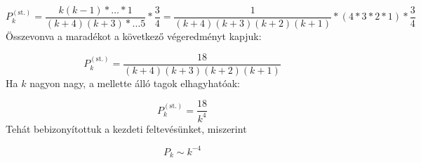 \begin{equation} \label{eq:23}
    P_{k}^{\left( \text{st.} \right)}
    =
    \frac{k \left( k - 1 \right) * \dotsc * 1}{\left( k + 4 \right) \left( k + 3 \right) * \dotsc 5} * \frac{3}{4}
    =
    \frac{1}{\left( k + 4 \right) \left( k + 3 \right) \left( k + 2 \right) \left( k + 1 \right)} * \left( 4 * 3 * 2 * 1 \right) * \frac{3}{4}
\end{equation}
Összevonva a maradékot a következő végeredményt kapjuk:

\begin{equation} \label{eq:24}
    P_{k}^{\left( \text{st.} \right)}
    =
    \frac{18}{\left( k + 4 \right) \left( k + 3 \right) \left( k + 2 \right) \left( k + 1 \right)}
\end{equation}
Ha $k$ nagyon nagy, a mellette álló tagok elhagyhatóak:

\begin{equation} \label{eq:25}
    P_{k}^{\left( \text{st.} \right)}
    =
    \frac{18}{k^{4}}
\end{equation}
Tehát bebizonyítottuk a kezdeti feltevésünket, miszerint

\begin{equation}
    \boxed{
    P_{k}
    \sim
    k^{-4}
    }
\end{equation}
